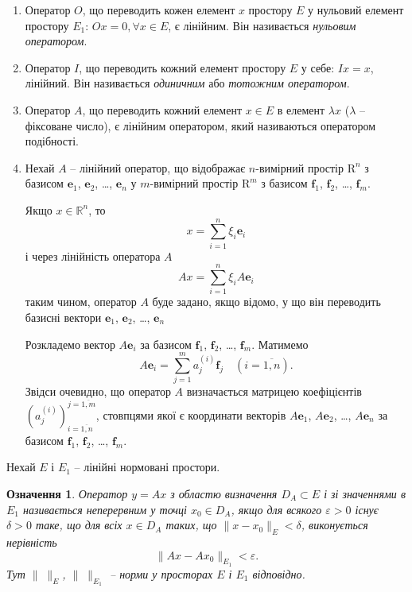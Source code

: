 \documentclass[14pt,twoside]{extreport}
\theoremstyle{mystyle}
\newtheorem{dfn}{Означення}
\numberwithin{equation}{chapter}
\begin{document}
\begin{enumerate}
	\item Оператор $O$, що переводить кожен елемент $x$ простору $E$ у нульовий елемент простору $E_1$: $Ox = 0, \forall x \in E$, є лінійним. Він називається \emph{нульовим оператором}.
	\item Оператор $I$, що переводить кожний елемент простору $E$ у себе: $Ix = x$, лінійний. Він називається \emph{одиничним} або \emph{тотожним оператором}.
	\item Оператор $A$, що переводить кожний елемент $x\in E$ в елемент $\lambda x$ ($\lambda$ -- фіксоване число), є лінійним оператором, який називаються оператором подібності.
	\item Нехай $A$ -- лінійний оператор, що відображає $n$-вимірний простір $\mathrm{R}^n$ з базисом $\mathbf{e}_1$, $\mathbf{e}_2$, \ldots, $\mathbf{e}_n$ у $m$-вимірний простір $\mathrm{R}^m$ з базисом $\mathbf{f}_1$, $\mathbf{f}_2$, \ldots, $\mathbf{f}_m$.
	
	Якщо $x \in \mathbb{R}^n$, то
	\[
	x=\sum_{i=1}^{n}\xi_i \mathbf{e}_i
	\]
	і через лінійність оператора $A$
	\[
	Ax=\sum_{i=1}^{n}\xi_i A\mathbf{e}_i
	\]
	таким чином, оператор $A$ буде задано, якщо відомо, у що він переводить базисні вектори $\mathbf{e}_1$, $\mathbf{e}_2$, \ldots, $\mathbf{e}_n$
	
	Розкладемо вектор $A\mathbf{e}_i$ за базисом $\mathbf{f}_1$, $\mathbf{f}_2$, \ldots, $\mathbf{f}_m$. Матимемо
	\[
	A\mathbf{e}_i = \sum_{j=1}^{m}a_j^{(i)}\mathbf{f}_j \quad (i=\overline{1,n}).
	\]
	Звідси очевидно, що оператор $A$ визначається матрицею коефіцієнтів $\left(a_j^{(i)}\right)_{i=\overline{1, n}}^{j=\overline{1,m}}$, стовпцями якої є координати векторів $A\mathbf{e}_1$, $A\mathbf{e}_2$, \ldots, $A\mathbf{e}_n$ за базисом $\mathbf{f}_1$, $\mathbf{f}_2$, \ldots, $\mathbf{f}_m$.
\end{enumerate}

Нехай $E$ і $E_1$ -- лінійні нормовані простори.

\begin{dfn}
	Оператор $y = Ax$ з областю визначення $D_A \subset E$ і зі значеннями в $E_1$ називається неперервним у точці $x_0 \in D_A$, якщо для всякого $\varepsilon > 0$ існує $\delta > 0$ таке, що для всіх $x \in D_A$ таких, що $\|x-x_0\|_E < \delta$, виконується нерівність
	\[
	\|Ax - Ax_0\|_{E_1} < \varepsilon.
	\]
	Тут $\|\;\|_E$, $\|\;\|_{E_1}$ -- норми у просторах $E$ і $E_1$ відповідно.
\end{dfn}
\end{document}
